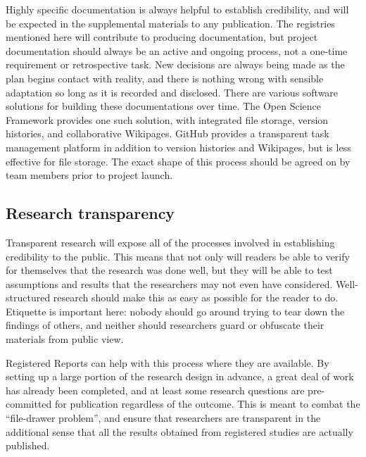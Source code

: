 Highly specific documentation is always helpful to establish credibility,
and will be expected in the supplemental materials to any publication.
The registries mentioned here will contribute to producing documentation,
but project documentation should always be an active and ongoing process,
not a one-time requirement or retrospective task.
New decisions are always being made as the plan begins contact with reality,
and there is nothing wrong with sensible adaptation so long as it is recorded and disclosed.
There are various software solutions for building these documentations over time.
The Open Science Framework provides one such solution,
with integrated file storage, version histories, and collaborative Wikipages.
GitHub provides a transparent task management platform
in addition to version histories and Wikipages, but is less effective for file storage.
The exact shape of this process should be agreed on by team members prior to project launch.

\subsection{Research transparency}

Transparent research will expose all of the processes involved in establishing credibility to the public.
This means that not only will readers be able to verify for themselves that the research was done well,
but they will be able to test assumptions and results that the researchers may not even have considered.
Well-structured research should make this as easy as possible for the reader to do.
Etiquette is important here: nobody should go around trying to tear down the findings of others,
and neither should researchers guard or obfuscate their materials from public view.

Registered Reports can help with this process where they are available.
By setting up a large portion of the research design in advance,
a great deal of work has already been completed,
and at least some research questions are pre-committed for publication regardless of the outcome.
This is meant to combat the ``file-drawer problem'',\cite{simonsohn2014p}
and ensure that researchers are transparent in the additional sense that
all the results obtained from registered studies are actually published.


